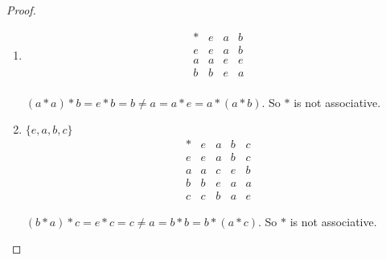 \begin{proof}
    \begin{enumerate}[label={\textbf{\alph*.}}]
        \item
              \[
                  \begin{array}{c|ccc}
                      * & e & a & b \\
                      \hline
                      e & e & a & b \\
                      a & a & e & e \\
                      b & b & e & a \\
                  \end{array}
              \]

              $(a * a) * b = e * b = b \ne a = a * e = a * (a * b)$. So $*$ is not associative.
        \item $\{ e, a, b, c \}$
              \[
                  \begin{array}{c|cccc}
                      * & e & a & b & c \\
                      \hline
                      e & e & a & b & c \\
                      a & a & c & e & b \\
                      b & b & e & a & a \\
                      c & c & b & a & e
                  \end{array}
              \]

              $(b * a) * c = e * c = c \ne a = b * b = b * (a * c)$. So $*$ is not associative.
    \end{enumerate}
\end{proof}

